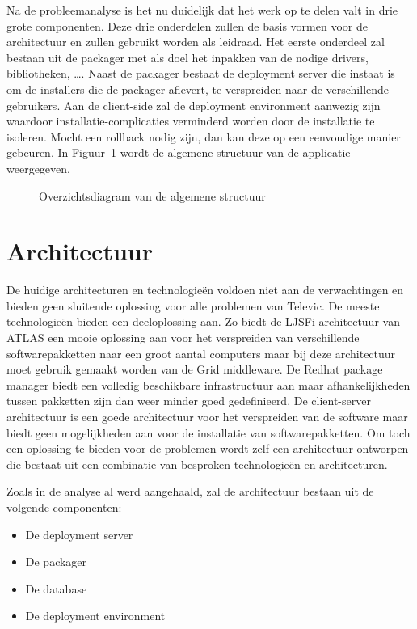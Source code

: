 
Na de probleemanalyse is het nu duidelijk dat het werk op te delen valt in drie grote componenten.
Deze drie onderdelen zullen de basis vormen voor de architectuur en zullen gebruikt worden als leidraad.
Het eerste onderdeel zal bestaan uit de packager met als doel het inpakken van de nodige drivers, bibliotheken, \ldots .
Naast de packager bestaat de deployment server die instaat is om de installers die de packager aflevert, te verspreiden naar de verschillende gebruikers.
Aan de client-side zal de deployment environment aanwezig zijn waardoor installatie-complicaties verminderd worden door de installatie te isoleren.
Mocht een rollback nodig zijn, dan kan deze op een eenvoudige manier gebeuren.
In Figuur~\ref{fig:overzichtsDiagram} wordt de algemene structuur van de applicatie weergegeven.

\begin{figure}[!hbt]
\centering
  
  \caption{Overzichtsdiagram van de algemene structuur}
  \label{fig:overzichtsDiagram}
\end{figure}

\section{Architectuur}
De huidige architecturen en technologieën voldoen niet aan de verwachtingen en bieden geen sluitende oplossing voor alle problemen van Televic.
De meeste technologieën bieden een deeloplossing aan.
Zo biedt de LJSFi architectuur van ATLAS een mooie oplossing aan voor het verspreiden van verschillende softwarepakketten naar een groot aantal computers maar bij deze architectuur moet gebruik gemaakt worden van de Grid middleware.
De Redhat package manager biedt een volledig beschikbare infrastructuur aan maar afhankelijkheden tussen pakketten zijn dan weer minder goed gedefinieerd.
De client-server architectuur is een goede architectuur voor het verspreiden van de software maar biedt geen mogelijkheden aan voor de installatie van softwarepakketten.
Om toch een oplossing te bieden voor de problemen wordt zelf een architectuur ontworpen die bestaat uit een combinatie van besproken technologieën en architecturen.

Zoals in de analyse al werd aangehaald, zal de architectuur bestaan uit de volgende componenten: 
\begin{itemize}
\item De deployment server
\item De packager
\item De database
\item De deployment environment
\end{itemize}

